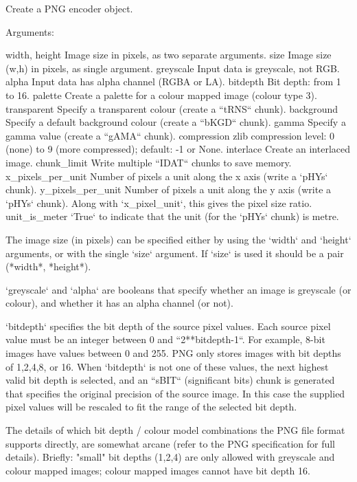 \begin{DoxyVerb}Create a PNG encoder object.

Arguments:

width, height
  Image size in pixels, as two separate arguments.
size
  Image size (w,h) in pixels, as single argument.
greyscale
  Input data is greyscale, not RGB.
alpha
  Input data has alpha channel (RGBA or LA).
bitdepth
  Bit depth: from 1 to 16.
palette
  Create a palette for a colour mapped image (colour type 3).
transparent
  Specify a transparent colour (create a ``tRNS`` chunk).
background
  Specify a default background colour (create a ``bKGD`` chunk).
gamma
  Specify a gamma value (create a ``gAMA`` chunk).
compression
  zlib compression level: 0 (none) to 9 (more compressed);
  default: -1 or None.
interlace
  Create an interlaced image.
chunk_limit
  Write multiple ``IDAT`` chunks to save memory.
x_pixels_per_unit
  Number of pixels a unit along the x axis (write a
  `pHYs` chunk).
y_pixels_per_unit
  Number of pixels a unit along the y axis (write a
  `pHYs` chunk). Along with `x_pixel_unit`, this gives
  the pixel size ratio.
unit_is_meter
  `True` to indicate that the unit (for the `pHYs`
  chunk) is metre.

The image size (in pixels) can be specified either by using the
`width` and `height` arguments, or with the single `size`
argument.  If `size` is used it should be a pair (*width*,
*height*).

`greyscale` and `alpha` are booleans that specify whether
an image is greyscale (or colour), and whether it has an
alpha channel (or not).

`bitdepth` specifies the bit depth of the source pixel values.
Each source pixel value must be an integer between 0 and
``2**bitdepth-1``.  For example, 8-bit images have values
between 0 and 255.  PNG only stores images with bit depths of
1,2,4,8, or 16.  When `bitdepth` is not one of these values,
the next highest valid bit depth is selected, and an ``sBIT``
(significant bits) chunk is generated that specifies the
original precision of the source image.  In this case the
supplied pixel values will be rescaled to fit the range of
the selected bit depth.

The details of which bit depth / colour model combinations the
PNG file format supports directly, are somewhat arcane
(refer to the PNG specification for full details).  Briefly:
"small" bit depths (1,2,4) are only allowed with greyscale and
colour mapped images; colour mapped images cannot have bit depth
16.


\end{DoxyVerb}
